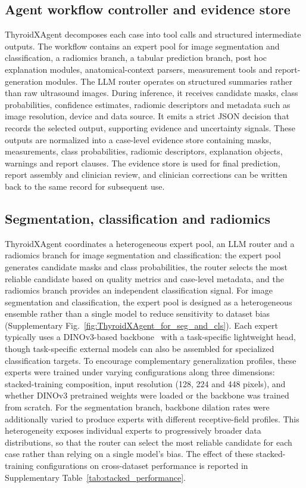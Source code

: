 \documentclass[fleqn,10pt]{wlscirep}
\begin{document}
\subsection{Agent workflow controller and evidence store}
ThyroidXAgent decomposes each case into tool calls and structured intermediate outputs. The workflow contains an expert pool for image segmentation and classification, a radiomics branch, a tabular prediction branch, post hoc explanation modules, anatomical-context parsers, measurement tools and report-generation modules. The LLM router operates on structured summaries rather than raw ultrasound images. During inference, it receives candidate masks, class probabilities, confidence estimates, radiomic descriptors and metadata such as image resolution, device and data source. It emits a strict JSON decision that records the selected output, supporting evidence and uncertainty signals. These outputs are normalized into a case-level evidence store containing masks, measurements, class probabilities, radiomic descriptors, explanation objects, warnings and report clauses. The evidence store is used for final prediction, report assembly and clinician review, and clinician corrections can be written back to the same record for subsequent use.

\subsection{Segmentation, classification and radiomics}
ThyroidXAgent coordinates a heterogeneous expert pool, an LLM router and a radiomics branch for image segmentation and classification: the expert pool generates candidate masks and class probabilities, the router selects the most reliable candidate based on quality metrics and case-level metadata, and the radiomics branch provides an independent classification signal. For image segmentation and classification, the expert pool is designed as a heterogeneous ensemble rather than a single model to reduce sensitivity to dataset bias~\cite{torralba2011unbiased,liu2024decade} (Supplementary Fig.~\ref{fig:ThyroidXAgent_for_seg_and_cls}). Each expert typically uses a DINOv3-based backbone~\cite{simeoni2025dinov3} with a task-specific lightweight head, though task-specific external models can also be assembled for specialized classification targets. To encourage complementary generalization profiles, these experts were trained under varying configurations along three dimensions: stacked-training composition, input resolution (128, 224 and 448 pixels), and whether DINOv3 pretrained weights were loaded or the backbone was trained from scratch. For the segmentation branch, backbone dilation rates were additionally varied to produce experts with different receptive-field profiles. This heterogeneity exposes individual experts to progressively broader data distributions, so that the router can select the most reliable candidate for each case rather than relying on a single model's bias. The effect of these stacked-training configurations on cross-dataset performance is reported in Supplementary Table~\ref{tab:stacked_performance}.
\end{document}

